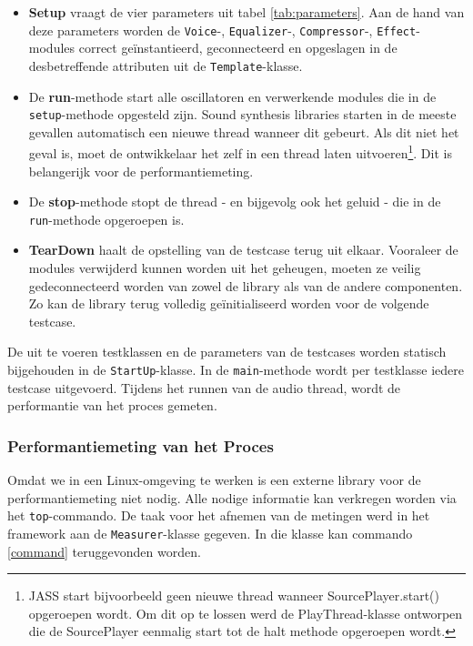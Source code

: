 \begin{itemize}
	\item \textbf{Setup} vraagt de vier parameters uit tabel \ref{tab:parameters}. Aan de hand van deze parameters worden de \verb+Voice+-, \verb+Equalizer+-, \verb+Compressor+-, \verb+Effect+-modules correct geïnstantieerd, geconnecteerd en opgeslagen in de desbetreffende attributen uit de \verb+Template+-klasse.
	\item De \textbf{run}-methode start alle oscillatoren en verwerkende modules die in de \verb+setup+-methode opgesteld zijn. Sound synthesis libraries starten in de meeste gevallen automatisch een nieuwe thread wanneer dit gebeurt. Als dit niet het geval is, moet de ontwikkelaar het zelf in een thread laten uitvoeren\footnote{JASS start bijvoorbeeld geen nieuwe thread wanneer SourcePlayer.start() opgeroepen wordt. Om dit op te lossen werd de PlayThread-klasse ontworpen die de SourcePlayer eenmalig start tot de halt methode opgeroepen wordt.}. Dit is belangerijk voor de performantiemeting. 
	\item De \textbf{stop}-methode stopt de thread - en bijgevolg ook het geluid - die in de \verb+run+-methode opgeroepen is.
	\item \textbf{TearDown} haalt de opstelling van de testcase terug uit elkaar. Vooraleer de modules verwijderd kunnen worden uit het geheugen, moeten ze veilig gedeconnecteerd worden van zowel de library als van de andere componenten. Zo kan de library terug volledig geïnitialiseerd worden voor de volgende testcase.
\end{itemize}

De uit te voeren testklassen en de parameters van de testcases worden statisch bijgehouden in de \verb+StartUp+-klasse. In de \verb+main+-methode wordt per testklasse iedere testcase uitgevoerd. Tijdens het runnen van de audio thread, wordt de performantie van het proces gemeten.

\subsubsection{Performantiemeting van het Proces}

Omdat we in een Linux-omgeving te werken is  een externe library voor de performantiemeting niet nodig. Alle nodige informatie kan verkregen worden via het \verb+top+-commando. De taak voor het afnemen van de metingen werd in het framework aan de \verb+Measurer+-klasse gegeven. In die klasse kan commando \ref{command} teruggevonden worden.

